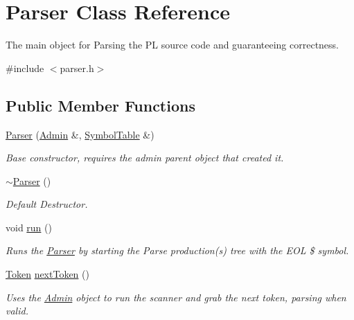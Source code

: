 \hypertarget{classParser}{
\section{Parser Class Reference}
\label{classParser}
}


The main object for Parsing the PL source code and guaranteeing correctness.  




{\ttfamily \#include $<$parser.h$>$}

\subsection*{Public Member Functions}
\begin{DoxyCompactItemize}
\item 
\hyperlink{classParser_adb5ff4e366a04633abe9d33e951196b2}{Parser} (\hyperlink{classAdmin}{Admin} \&, \hyperlink{classSymbolTable}{SymbolTable} \&)
\begin{DoxyCompactList}\small\item\em Base constructor, requires the admin parent object that created it. \item\end{DoxyCompactList}\item 
\hyperlink{classParser_a3e658b5917a93a3ef648050d060e3a93}{$\sim$Parser} ()
\begin{DoxyCompactList}\small\item\em Default Destructor. \item\end{DoxyCompactList}\item 
void \hyperlink{classParser_a9e8d06d145f534e73a40b38e3f6711a0}{run} ()
\begin{DoxyCompactList}\small\item\em Runs the \hyperlink{classParser}{Parser} by starting the Parse production(s) tree with the EOL \$ symbol. \item\end{DoxyCompactList}\item 
\hyperlink{classToken}{Token} \hyperlink{classParser_ab53c98f6ae7ca5a9a48a1eec75fb52bc}{nextToken} ()
\begin{DoxyCompactList}\small\item\em Uses the \hyperlink{classAdmin}{Admin} object to run the scanner and grab the next token, parsing when valid. \item\end{DoxyCompactList}\item 

\end{DoxyCompactItemize}
